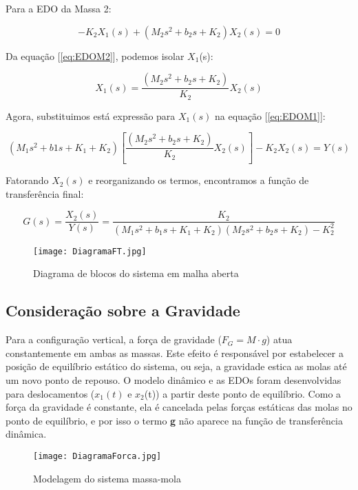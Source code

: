 \documentclass[9pt,a4paper,twocolumn,twoside]{tau-class/tau}
\begin{document}
Para a EDO da Massa 2:

\begin{equation}
    -K_2X_1(s) + (M_2s^2 + b_2s + K_2)X_2(s) = 0
    \label{eq:EDOM2}
\end{equation}

Da equação [\ref{eq:EDOM2}], podemos isolar $X_1$(s):

\begin{equation}
    X_1(s) = \frac{(M_2s^2 + b_2s + K_2)}{K_2}X_2(s)
    \label{eq:X1iso}
\end{equation}

Agora, substituimos está expressão para $X_1(s)$ na equação [\ref{eq:EDOM1}]:

\begin{equation}
    (M_1s^2 + b1s + K_1 + K_2)\left[\frac{(M_2s^2 + b_2s + K_2)}{K_2}X_2(s)\right] - K_2X_2(s) = Y(s)
    \label{eq:substX1}
\end{equation}

Fatorando $X_2(s)$ e reorganizando os termos, encontramos a função de transferência final:

\begin{equation}
    G(s) = \frac{X_2 (s)}{Y(s)} = \frac{K_2}{(M_1 s^2 + b_1 s + K_1 + K_2)(M_2 s^2 + b_2 s + K_2) - K_2 ^2}
\label{eq: FT}
\end{equation}

\begin{figure}[H]
    \centering
    \texttt{[image: DiagramaFT.jpg]}
    \caption{Diagrama de blocos do sistema em malha aberta}
    \label{DiagramaFT}
\end{figure}

\subsection{Consideração sobre a Gravidade}

Para a configuração vertical, a força de gravidade ($F_G = M \cdot g$) atua constantemente em ambas as massas. Este efeito é responsável por estabelecer a posição de equilíbrio estático do sistema, ou seja, a gravidade estica as molas até um novo ponto de repouso. O modelo dinâmico e as EDOs foram desenvolvidas para deslocamentos ($x_1(t)$ e $x_2$(t)) a partir deste ponto de equilíbrio. Como a força da gravidade é constante, ela é cancelada pelas forças estáticas das molas no ponto de equilíbrio, e por isso o termo \textbf{g} não aparece na função de transferência dinâmica.

\begin{figure}[H]
    \centering
    \texttt{[image: DiagramaForca.jpg]}
    \caption{Modelagem do sistema massa-mola}
    \label{fig:MSM}
\end{figure}
\end{document}
